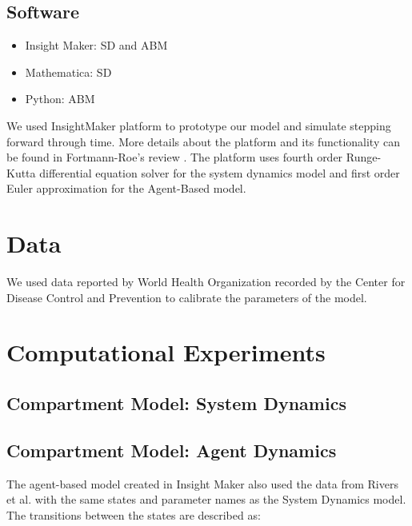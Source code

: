 \documentclass[10pt]{article}
\begin{document}
\subsection{Software}
\begin{itemize}
\item Insight Maker: SD and ABM
\item Mathematica: SD
\item Python: ABM

\end{itemize}
We used InsightMaker platform to prototype our model and simulate stepping forward through time. More details about the platform and its functionality can be found in Fortmann-Roe's review \cite{FortmannRoe}. The platform uses fourth order Runge-Kutta differential equation solver for the system dynamics model and  first order Euler approximation for the Agent-Based model.

%
%
%
%
%
%
%
%
%
\section{Data}\label{sec:Data}
We used data reported by World Health Organization recorded by the Center for Disease Control and Prevention \cite{CDCData} to calibrate the parameters of the model. 

\section{Computational Experiments}

\subsection{Compartment Model: System Dynamics}

\subsection{Compartment Model: Agent Dynamics}
The agent-based model created in Insight Maker also used the data from Rivers et al. with the same states and parameter names as the System Dynamics model. The transitions between the states are described as:\\
\end{document}
